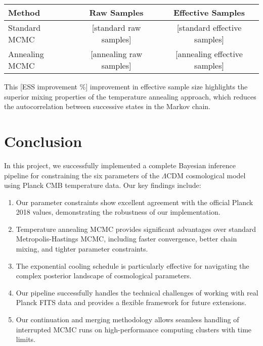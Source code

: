 \documentclass[11pt]{article}
\theoremstyle{definition}
\begin{document}
\begin{center}
\begin{tabular}{l c c}
\toprule
\textbf{Method} & \textbf{Raw Samples} & \textbf{Effective Samples} \\
\midrule
Standard MCMC & [standard raw samples] & [standard effective samples] \\
Annealing MCMC & [annealing raw samples] & [annealing effective samples] \\
\bottomrule
\end{tabular}
\end{center}

\noindent This [ESS improvement \%] improvement in effective sample size highlights the superior mixing properties of the temperature annealing approach, which reduces the autocorrelation between successive states in the Markov chain.

\section{Conclusion}

In this project, we successfully implemented a complete Bayesian inference pipeline for constraining the six parameters of the $\Lambda$CDM cosmological model using Planck CMB temperature data. Our key findings include:

\begin{enumerate}
  \item Our parameter constraints show excellent agreement with the official Planck 2018 values, demonstrating the robustness of our implementation.
  
  \item Temperature annealing MCMC provides significant advantages over standard Metropolis-Hastings MCMC, including faster convergence, better chain mixing, and tighter parameter constraints.
  
  \item The exponential cooling schedule is particularly effective for navigating the complex posterior landscape of cosmological parameters.
  
  \item Our pipeline successfully handles the technical challenges of working with real Planck FITS data and provides a flexible framework for future extensions.
  
  \item Our continuation and merging methodology allows seamless handling of interrupted MCMC runs on high-performance computing clusters with time limits.
\end{enumerate}
\end{document}
